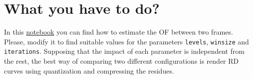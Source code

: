 \begin{comment}
The OF~\cite{horn1981determining} tries to establish connections between the pixels of
the frames $P$ and $R$ supposing that:
\begin{enumerate}
\item $P$ and $R$ are adjacent in time (if $R$ was taken at time $t$,
  $P$ is taken at time $dt+t$) and therefore, similar in
  content.
\item Similarity between images implies that the pixels in both
  frames, $R$ and $P$, will have the same luminance. If $I(x,y,t)$
  measures the luminance of the pixel $(x,y)$ of the frame $R$,
  similarity can be modeled by
  \begin{equation}
    I(x+dx, y+dy, t+dt) = I(x,y,t),
    \label{eq:similarity}
  \end{equation}
  where $I(x+dx, y+dy, t+dt)$ is the corresponding pixel in the frame
  $P$. The first part of the Eq.~\ref{eq:similarity} can be also
  computed by (using the first-order Taylor expansion) as
  \begin{equation}
    I(x+dx, y+dy, t+dt) = I(x,y,t) + \frac{\partial I}{\partial x}dx + \frac{\partial I}{\partial y}dy + \frac{\partial I}{\partial t}dt,
    \label{eq:taylor_exp}
  \end{equation}
  andtherefore, it must be true that
  \begin{equation}
    \frac{\partial I}{\partial x}dx + \frac{\partial I}{\partial y}dy + \frac{\partial I}{\partial t}dt = 0.
    \label{eq:constraint}
  \end{equation}
  Dividing by $dt$, we finally get that
  \begin{equation}
    \frac{\partial I}{\partial x}\frac{dx}{dt} + \frac{\partial I}{\partial y}\frac{dy}{dt} + \frac{\partial I}{\partial t} = 0.
  \end{equation}
\item Adjacent pixels follow parallel
  trajectories~\cite{horn1981determining}, with basically means that
  neighbor pixels will have similar motion.
\end{enumerate}
\end{comment}

\section{What you have to do?}

In this
\href{https://github.com/Sistemas-Multimedia/Sistemas-Multimedia.github.io/blob/master/study_guide/10-ME/optical_flow.ipynb}{notebook}
you can find how to estimate the OF between two frames. Please, modify
it to find suitable values for the parameters \texttt{levels},
\texttt{winsize} and \texttt{iterations}. Supposing that the impact of
each parameter is independent from the rest, the best way of comparing
two different configurations is render RD curves using quantization
and compressing the residues.

